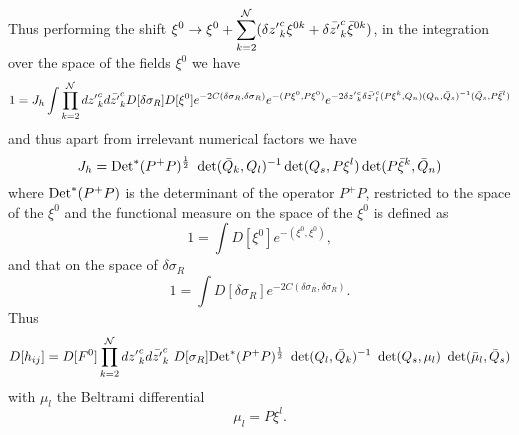 \documentclass[a4paper,12pt]{article}
\begin{document}
Thus performing the shift $\displaystyle{\xi^0\rightarrow 
\xi^0+\sum_{k=2}^{\cal N} (\delta {z'}^c_k \xi^{0k}}+\delta \bar{z'}^c_k
\bar\xi^{0k})$, in the integration  
over the space of the fields $\xi^0$ we have
\begin{equation}
1=J_h \int \prod_{k=2}^{\cal N} d{z'}^c_k d\bar {z'}^c_k
D[\delta \sigma_R]D[\xi^0] 
e^{-2C(\delta \sigma_R, \delta \sigma_R)} e^{-(P\xi^0, P\xi^0)}
e^{-2\delta {z'}^c_k \delta \bar {z'}^c_l(P\xi^{k}, Q_n)(Q_n,
\bar Q_s)^{-1}(\bar Q_s, P\bar \xi^{l})}
\end{equation}
and thus apart from irrelevant numerical factors we have
\begin{equation}
J_h = {\rm Det}^*(P^+P)^{\frac{1}{2}}~\det(\bar Q_k, Q_l)^{-1}
\det(Q_s, P\xi^{l})\det(P\bar \xi^{k},\bar Q_n)
\end{equation}
where ${\rm Det}^*(P^+P)$ is the determinant of the operator $P^+P$,
restricted to the space of the $\xi^0$ \cite{dhoker} and the
functional measure on 
the space of the $\xi^0$ is defined as
\begin{equation}
1=\int D[\xi^0]e^{-(\xi^0, \xi^0)},
\end{equation}
and that on the space of $\delta \sigma_R$ 
\begin{equation}
1=\int D[\delta \sigma_R] e^{-2C(\delta\sigma_R,\delta\sigma_R)}.
\end{equation}
Thus
\begin{equation}
D[h_{ij}]=D[F^0]\prod_{k=2}^{\cal N} d{z'}^c_k d\bar {z'}^c_k~
D[\sigma_R]{\rm Det}^*(P^+P)^{\frac{1}{2}}~ 
\det(Q_l, \bar Q_k)^{-1}~ \det(Q_s, \mu_l)~ \det(\bar \mu_l, \bar Q_s)
\end{equation}
with $\mu_l$ the Beltrami differential
\begin{equation}
\mu_l = P\xi^{l}.
\end{equation}
\end{document}
